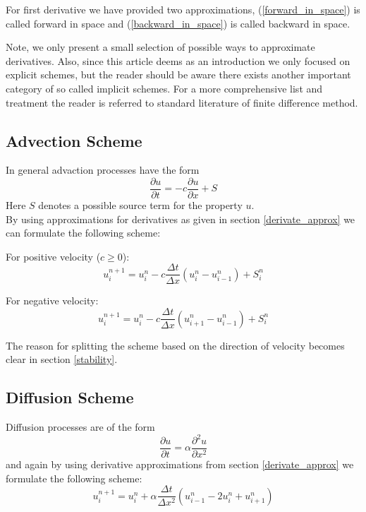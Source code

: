 \documentclass[]{article}
\begin{document}
For first derivative we have provided two approximations, (\ref{forward_in_space}) is called
forward in space and (\ref{backward_in_space}) is called backward in space.

Note, we only present a small selection of possible ways to approximate derivatives. Also, since this article deems as an introduction we only focused on explicit schemes, but the reader should be aware there exists another important category of so called implicit schemes.
For a more comprehensive list and treatment the reader is referred to standard literature of finite difference method.

\subsection{Advection Scheme}

In general advaction processes have the form
\begin{equation*}
\frac{\partial u}{\partial t} = -c \frac{\partial u}{\partial x} + S
\end{equation*}
Here $S$ denotes a possible source term for the property $u$.\\
By using approximations for derivatives as given in section \ref{derivate_approx}
we can formulate the following scheme:

For positive velocity ($c\geq 0$):
\begin{equation} \label{advection_scheme_upwind}
u_{i}^{n+1}=u_{i}^{n}-c\frac{\Delta t}{\Delta x} (u_{i}^{n}-u_{i-1}^{n}) + S_{i}^{n}
\end{equation}

For negative velocity:
\begin{equation} \label{advection_scheme_downwind}
u_{i}^{n+1}=u_{i}^{n}-c\frac{\Delta t}{\Delta x} (u_{i+1}^{n}-u_{i-1}^{n}) +S_{i}^{n}
\end{equation}

The reason for splitting the scheme based on the direction of velocity becomes clear in section \ref{stability}.

\subsection{Diffusion Scheme}
Diffusion processes are of the form
\begin{equation*}
\frac{\partial u}{\partial t} = \alpha \frac{\partial^2 u}{\partial x^2}
\end{equation*}
and again by using derivative approximations from section \ref{derivate_approx} we
formulate the following scheme:
\begin{equation} \label{diffusion_scheme}
u_{i}^{n+1}=u_{i}^ {n}+\alpha\frac{\Delta t}{\Delta x^{2}} (u_{i-1}^{n}-2u_{i}^{n}+u_{i+1}^{n})
\end{equation}
\end{document}
